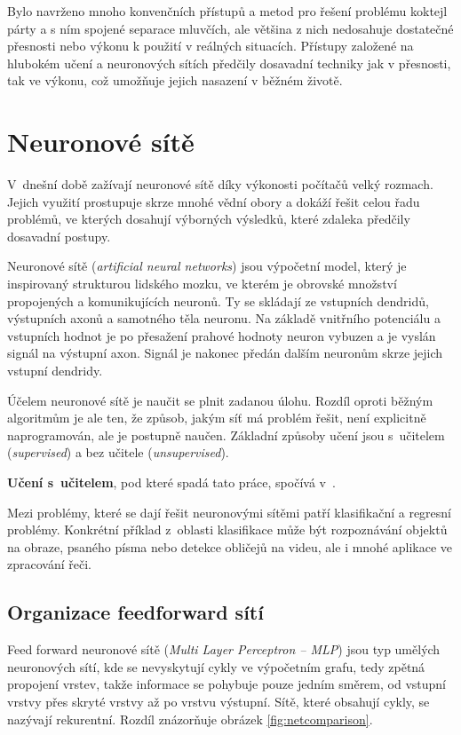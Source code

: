 Bylo navrženo mnoho konvenčních přístupů a metod pro řešení problému koktejl párty a s ním spojené separace mluvčích, ale většina z nich nedosahuje dostatečné přesnosti nebo výkonu k použití v reálných situacích. Přístupy založené na hlubokém učení a neuronových sítích předčily dosavadní techniky jak v přesnosti, tak ve výkonu, což umožňuje jejich nasazení v běžném životě.


\chapter{Neuronové sítě}
\label{neuronovky}
V~dnešní době zažívají neuronové sítě díky výkonosti počítačů velký rozmach. Jejich využití prostupuje skrze mnohé vědní obory a dokáží řešit celou řadu problémů, ve kterých dosahují výborných výsledků, které zdaleka předčily dosavadní postupy. 

Neuronové sítě (\textit{artificial neural networks}) jsou výpočetní model, který je inspirovaný strukturou lidského mozku, ve kterém je obrovské množství propojených a komunikujících neuronů. Ty se skládají ze vstupních dendridů, výstupních axonů a samotného těla neuronu. Na základě vnitřního potenciálu a vstupních hodnot je po přesažení prahové hodnoty neuron vybuzen a je vyslán signál na výstupní axon. Signál je nakonec předán dalším neuronům skrze jejich vstupní dendridy\cite[p.~65--66]{mitdeeplearning_small}.

Účelem neuronové sítě je naučit se plnit zadanou úlohu. Rozdíl oproti běžným algoritmům je ale ten, že způsob, jakým síť má problém řešit, není explicitně naprogramován, ale je postupně naučen. Základní způsoby učení jsou s~učitelem (\textit{supervised}) a bez učitele (\textit{unsupervised}). 

\textbf{Učení s~učitelem}, pod které spadá tato práce, spočívá v~.

Mezi problémy, které se dají řešit neuronovými sítěmi patří klasifikační a regresní problémy. Konkrétní příklad z~oblasti klasifikace může být rozpoznávání objektů na obraze, psaného písma nebo detekce obličejů na videu, ale i mnohé aplikace ve zpracování řeči.




\section{Organizace feedforward sítí}
Feed forward neuronové sítě (\textit{Multi Layer Perceptron -- MLP}) jsou typ umělých neuronových sítí, kde se nevyskytují cykly ve výpočetním grafu, tedy zpětná propojení vrstev, takže informace se pohybuje pouze jedním směrem, od vstupní vrstvy přes skryté vrstvy až po vrstvu výstupní. Sítě, které obsahují cykly, se nazývají rekurentní. Rozdíl znázorňuje obrázek \ref{fig:netcomparison}.

